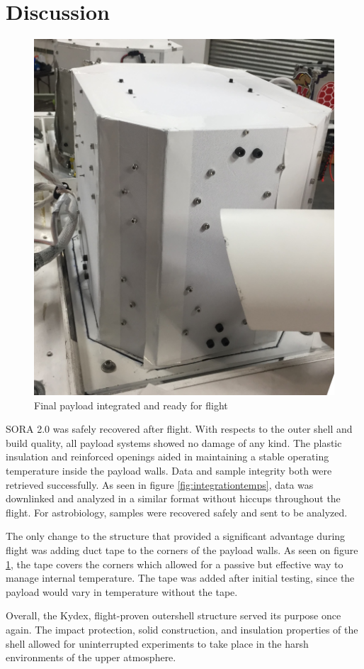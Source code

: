 \clearpage
\section{Discussion}
\label{sec:Discussion}
\begin{figure}[h!]
	\begin{center}
		\includegraphics[width=70 mm, scale=1]{figures/payload_integrated.JPG}
		\caption{Final payload integrated and ready for flight}
		\label{fig:payload_int}
	\end{center}
\end{figure}

SORA 2.0 was safely recovered after flight.  With respects to the outer shell and build quality, all payload systems showed no damage of any kind.  The plastic insulation and reinforced openings aided in maintaining a stable operating temperature inside the payload walls.  Data and sample integrity both were retrieved successfully.  As seen in figure \ref{fig:integrationtemps}, data was downlinked and analyzed in a similar format without hiccups throughout the flight.  For astrobiology, samples were recovered safely and sent to be analyzed.  

The only change to the structure that provided a significant advantage during flight was adding duct tape to the corners of the payload walls.  As seen on figure \ref{fig:payload_int}, the tape covers the corners which allowed for a passive but effective way to manage internal temperature.  The tape was added after initial testing, since the payload would vary in temperature without the tape.  

Overall, the Kydex, flight-proven outershell structure served its purpose once again.  The impact protection, solid construction, and insulation properties of the shell allowed for uninterrupted experiments to take place in the harsh environments of the upper atmosphere.